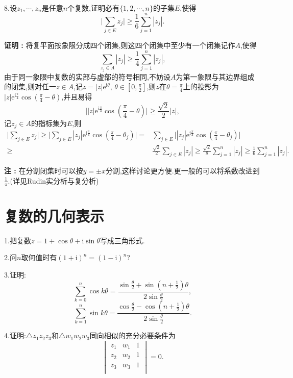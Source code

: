 \documentclass[12pt,fontset=none]{ctexbook}
\newenvironment{proof}[1][]{\par \noindent \textbf{\hspace{2em}证明 \vspace{0.1mm} #1 :}}{\par}
\renewcommand{\i}{\mathrm{i}}
\newcommand{\e}{\mathrm{e}}
\newenvironment{remark}[1][]{\par \noindent \textbf{\hspace{2em}注 \vspace{0.1mm} :}}{\par}
\begin{document}
\

8.设$z_{1},\cdots,z_{n}$是任意$n$个复数,证明必有$\{1,2,\cdots,n\}$的子集$E$,使得
$$\big|\sum\limits_{j \in E} z_{j}\big| \geqslant \frac{1}{6}\sum\limits_{j=1}^{n} |z_{j}| .$$
\begin{proof}
    将复平面按象限分成四个闭集,则这四个闭集中至少有一个闭集记作$A$,使得
    $$\sum\limits_{z_{j} \in A}|z_{j}| \geqslant \frac{1}{4}\sum\limits_{j=1}^{n}|z_{j}|,$$
    由于同一象限中复数的实部与虚部的符号相同,不妨设$A$为第一象限与其边界组成的闭集,则对任一$z \in A$,记$z=|z|\e^{{\i \theta}},\, \theta \in [0,\frac{\pi}{2}]$,则$z$在$\theta=\frac{\pi}{4}$上的投影为$|z|\e^{\i \frac{\pi}{4}}\cos(\frac{\pi}{4}-\theta)$,并且易得
    $$\big||z|\e^{\i \frac{\pi}{4}}\cos(\frac{\pi}{4}-\theta)\big| \geqslant \frac{\sqrt{2}}{2}|z|,$$
    记$z_{j} \in A$的指标集为$E$,则
    $$
    \begin{aligned}
      \big|\sum\limits_{j \in E} z_{j}\big|\geqslant \big|\sum\limits_{j \in E} |z_{j}|\e^{\i \frac{\pi}{4}}\cos(\frac{\pi}{4}-\theta_{j})\big|= & \sum\limits_{j \in E}\big||z_{j}|\e^{\i \frac{\pi}{4}}\cos(\frac{\pi}{4}-\theta_{j})\big| \\
      \geqslant & \frac{\sqrt{2}}{2}\sum\limits_{j \in E}|z_{j}| 
      \geqslant  \frac{\sqrt{2}}{8}\sum\limits_{j =1}^{n}|z_{j}| 
      \geqslant  \frac{1}{6}\sum\limits_{j =1}^{n}|z_{j}|.
    \end{aligned}
    $$
   
\end{proof}

\begin{remark}
    在分割闭集时可以按$y=\pm x$分割,这样讨论更方便.更一般的可以将系数改进到$\frac{1}{\pi}$.(详见Rudin实分析与复分析)
\end{remark}




\newpage
\section{复数的几何表示}
1.把复数$z=1+\cos \theta + \i \sin \theta$写成三角形式.


2.问$n$取何值时有$(1+\i)^{n}=(1-\i)^{n}$?


3.证明:
$$\sum\limits_{k=0}^{n}\cos k\theta=\frac{\sin \frac{\theta}{2}+\sin\left(n+\frac{1}{2}\right)\theta}{2\sin \frac{\theta}{2}},$$
$$\sum\limits_{k=1}^{n}\sin k\theta=\frac{\cos \frac{\theta}{2}-\cos\left(n+\frac{1}{2}\right)\theta}{2\sin \frac{\theta}{2}}.$$

4.证明:$\bigtriangleup z_{1}z_{2}z_{3}$和$\bigtriangleup w_{1}w_{2}w_{3}$同向相似的充分必要条件为
$$
\begin{vmatrix}
  z_{1} & w_{1} & 1 \\
  z_{2} & w_{2} & 1 \\
  z_{3} & w_{3} & 1 \\
\end{vmatrix}=0.
$$
\end{document}

